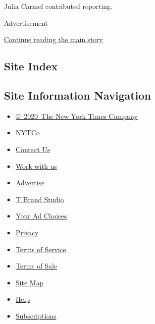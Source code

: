 Julia Carmel contributed reporting.

Advertisement

\protect\hyperlink{after-bottom}{Continue reading the main story}

\hypertarget{site-index}{%
\subsection{Site Index}\label{site-index}}

\hypertarget{site-information-navigation}{%
\subsection{Site Information
Navigation}\label{site-information-navigation}}

\begin{itemize}
\tightlist
\item
  \href{https://help.nytimes.com/hc/en-us/articles/115014792127-Copyright-notice}{©~2020~The
  New York Times Company}
\end{itemize}

\begin{itemize}
\tightlist
\item
  \href{https://www.nytco.com/}{NYTCo}
\item
  \href{https://help.nytimes.com/hc/en-us/articles/115015385887-Contact-Us}{Contact
  Us}
\item
  \href{https://www.nytco.com/careers/}{Work with us}
\item
  \href{https://nytmediakit.com/}{Advertise}
\item
  \href{http://www.tbrandstudio.com/}{T Brand Studio}
\item
  \href{https://www.nytimes.com/privacy/cookie-policy\#how-do-i-manage-trackers}{Your
  Ad Choices}
\item
  \href{https://www.nytimes.com/privacy}{Privacy}
\item
  \href{https://help.nytimes.com/hc/en-us/articles/115014893428-Terms-of-service}{Terms
  of Service}
\item
  \href{https://help.nytimes.com/hc/en-us/articles/115014893968-Terms-of-sale}{Terms
  of Sale}
\item
  \href{https://spiderbites.nytimes.com}{Site Map}
\item
  \href{https://help.nytimes.com/hc/en-us}{Help}
\item
  \href{https://www.nytimes.com/subscription?campaignId=37WXW}{Subscriptions}
\end{itemize}
